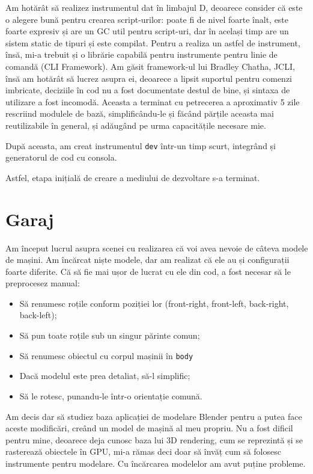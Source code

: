 \documentclass[a4paper,12pt]{report}
\begin{document}
Am hotărât să realizez instrumentul dat în limbajul D, deoarece consider că este o alegere bună pentru crearea script-urilor: poate fi de nivel foarte înalt, este foarte expresiv și are un \ac{GC} util pentru script-uri, dar în același timp are un sistem static de tipuri și este compilat.
Pentru a realiza un astfel de instrument, însă, mi-a trebuit și o librărie capabilă pentru instrumente pentru linie de comandă (CLI Framework).
Am găsit framework-ul lui Bradley Chatha, JCLI, însă am hotărât să lucrez asupra ei, deoarece a lipsit suportul pentru comenzi imbricate, deciziile în cod nu a fost documentate destul de bine, și sintaxa de utilizare a fost incomodă.
Aceasta a terminat cu petrecerea a aproximativ 5 zile rescriind modulele de bază, simplificându-le și făcând părțile aceasta mai reutilizabile în general, și adăugând pe urma capacitățile necesare mie.

După aceasta, am creat instrumentul \texttt{dev} într-un timp scurt, integrând și generatorul de cod cu consola.

Astfel, etapa inițială de creare a mediului de dezvoltare s-a terminat.


\section{Garaj}

Am început lucrul asupra scenei cu realizarea că voi avea nevoie de câteva modele de mașini.
Am încărcat niște modele, dar am realizat că ele au și configurații foarte diferite.
Că să fie mai ușor de lucrat cu ele din cod, a fost necesar să le preprocesez manual:

\begin{itemize}
  \item Să renumesc roțile conform poziției lor (front-right, front-left, back-right, back-left);
  \item Să pun toate roțile sub un singur părinte comun;
  \item Să renumesc obiectul cu corpul mașinii în \texttt{body}
  \item Dacă modelul este prea detaliat, să-l simplific;
  \item Să le rotesc, punandu-le într-o orientație comună.
\end{itemize}

Am decis dar să studiez baza aplicației de modelare Blender pentru a putea face aceste modificări, creând un model de mașină al meu propriu.
Nu a fost dificil pentru mine, deoarece deja cunosc baza lui \ac{3D} rendering, cum se reprezintă și se rasterează obiectele în \ac{GPU}, mi-a rămas deci doar să învăț cum să folosesc instrumente pentru modelare.
Cu încărcarea modelelor am avut puține probleme.
\end{document}
